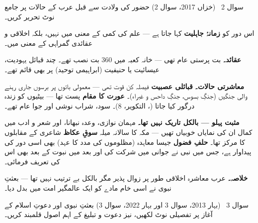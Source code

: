 \begin{sawal}{سوال \textenglish{2} \ \textnormal{\small(خزاں \textenglish{2017}، سوال \textenglish{2})}}
حضور \saw کی ولادت سے قبل عرب کے حالات پر جامع نوٹ تحریر کریں۔
\end{sawal}

\begin{hal}
اس دور کو \textbf{زمانۂ جاہلیت} کہا جاتا ہے --- علم کی کمی کے معنی میں نہیں،
بلکہ اخلاقی و عقائدی گمراہی کے معنی میں۔

\medskip
\textbf{عقائد۔} بت پرستی عام تھی --- خانہ کعبہ میں \textenglish{360} بت
نصب تھے۔ چند قبائل یہودیت، عیسائیت یا حنیفیت (ابراہیمی توحید) پر بھی قائم
تھے۔

\medskip
\textbf{معاشرتی حالات۔} \textbf{قبائلی عصبیت} فیصلہ کن قوت تھی --- معمولی
باتوں پر برسوں جاری رہنے والی جنگیں (جنگِ بسوس، جنگِ داحس و غبراء)۔
\textbf{عورت کا مقام} پست تھا --- بیٹیوں کو زندہ درگور کیا جاتا
(، التکویر، \textenglish{8})۔ سود،
شراب نوشی اور جوا عام تھے۔

\medskip
\textbf{مثبت پہلو --- بالکل تاریک نہیں تھا۔} مہمان نوازی، وعدہ نبھانا، اور
شعر و ادب میں کمال ان کی نمایاں خوبیاں تھیں --- مکہ کا سالانہ میلہ
\textbf{سوقِ عکاظ} شاعری کے مقابلوں کا مرکز تھا۔ \textbf{حلفِ فضول} جیسا
معاہدہ (مظلوموں کی مدد کا عہد) بھی اسی دور کی پیداوار ہے، جس میں نبی \saw
نے جوانی میں شرکت کی اور بعد میں نبوت کے بعد بھی اس کی تعریف فرمائی۔

\medskip
\textbf{خلاصہ۔} عرب معاشرہ اخلاقی طور پر زوال پذیر مگر بالکل بے ترتیب نہیں
تھا --- بعثتِ نبوی نے اسی خام مادے کو ایک عالمگیر امت میں بدل دیا۔
\end{hal}

\begin{sawal}{سوال \textenglish{3} \ \textnormal{\small(بہار \textenglish{2013}، سوال \textenglish{3} اور بہار \textenglish{2022}، سوال \textenglish{3})}}
بعثتِ نبوی اور دعوتِ اسلام کے آغاز پر تفصیلی نوٹ لکھیں، نیز دعوت و تبلیغ کے
اہم اصول قلمبند کریں۔
\end{sawal}

